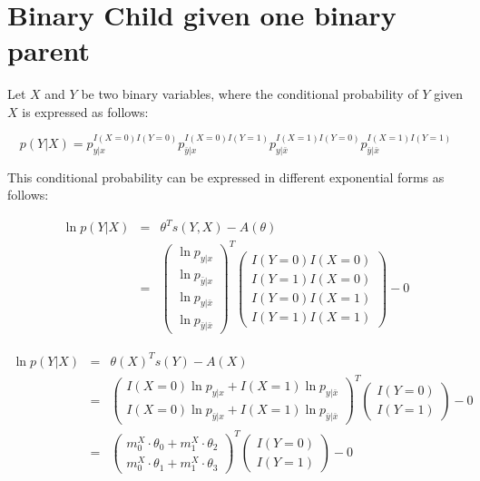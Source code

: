 \documentclass[11pt, oneside]{article}   	%
\numberwithin{figure}{section}
\numberwithin{equation}{section}
\numberwithin{table}{section}
\begin{document}
\section{Binary Child given one binary parent}

Let $X$ and $Y$ be two binary variables, where the conditional probability of $Y$ given $X$ is expressed as follows:

$$ p(Y|X) = p_{y|x}^{I(X=0)I(Y=0)}p_{\bar{y}|x}^{I(X=0)I(Y=1)}p_{y|\bar{x}}^{I(X=1)I(Y=0)}p_{\bar{y}|\bar{x}}^{I(X=1)I(Y=1)}$$


This conditional probability can be expressed in different exponential forms as follows:


\begin{eqnarray*}
\ln p(Y|X) &=& \theta^T s(Y,X) - A(\theta) \\
&=&
\begin{pmatrix}
\ln p_{y|x}\\
\ln p_{\bar{y}|x}\\
\ln p_{y|\bar{x}}\\
\ln p_{\bar{y}|\bar{x}}
\end{pmatrix}^T
\begin{pmatrix}
I(Y=0)I(X=0) \\
I(Y=1)I(X=0) \\
I(Y=0)I(X=1) \\
I(Y=1)I(X=1) 
\end{pmatrix}
- 0
\end{eqnarray*}


\begin{eqnarray*}
\ln p(Y|X) &=& \theta(X)^Ts(Y) - A(X) \\
&=&
\begin{pmatrix}
I(X=0)\ln p_{y|x}  + I(X=1)\ln p_{y|\bar{x}}\\
I(X=0)\ln p_{\bar{y}|x}  + I(X=1)\ln p_{\bar{y}|\bar{x}}
\end{pmatrix}^T
\begin{pmatrix}
I(Y=0) \\
I(Y=1)
\end{pmatrix}
- 0 \\
&=&
\begin{pmatrix}
m^X_0\cdot\theta_0  + m^X_1\cdot\theta_2\\
m^X_0\cdot\theta_1  + m^X_1\cdot\theta_3
\end{pmatrix}^T
\begin{pmatrix}
I(Y=0) \\
I(Y=1)
\end{pmatrix}
- 0 
\end{eqnarray*}
\end{document}
